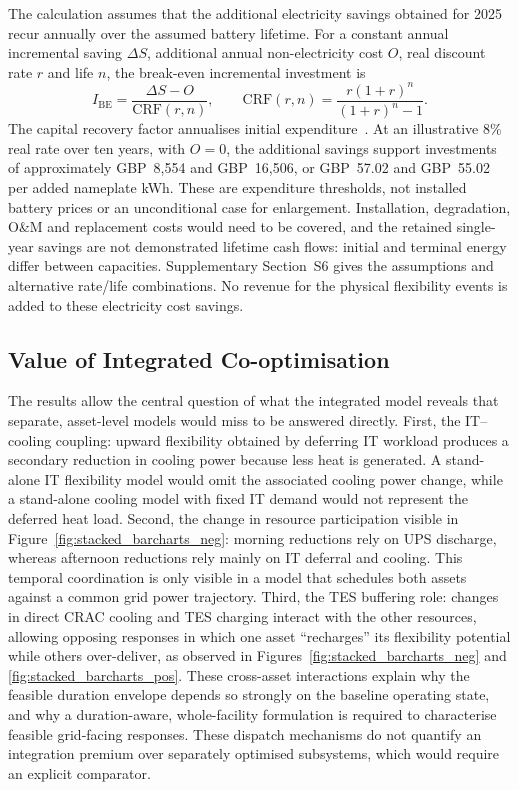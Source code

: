 \documentclass[lettersize,journal]{IEEEtran}
\begin{document}
The calculation assumes that the additional electricity savings obtained for 2025 recur annually over the assumed battery lifetime. For a constant annual incremental saving $\Delta S$, additional annual non-electricity cost $O$, real discount rate $r$ and life $n$, the break-even incremental investment is
\begin{equation}
I_{\mathrm{BE}}=\frac{\Delta S-O}{\mathrm{CRF}(r,n)},\qquad
\mathrm{CRF}(r,n)=\frac{r(1+r)^n}{(1+r)^n-1}.
\label{eq:ups-investment}
\end{equation}
The capital recovery factor annualises initial expenditure~\cite{sam_crf}. At an illustrative 8\% real rate over ten years, with $O=0$, the additional savings support investments of approximately GBP~8,554 and GBP~16,506, or GBP~57.02 and GBP~55.02 per added nameplate kWh. These are expenditure thresholds, not installed battery prices or an unconditional case for enlargement. Installation, degradation, O\&M and replacement costs would need to be covered, and the retained single-year savings are not demonstrated lifetime cash flows: initial and terminal energy differ between capacities. Supplementary Section~S6 gives the assumptions and alternative rate/life combinations. No revenue for the physical flexibility events is added to these electricity cost savings.


\subsection{Value of Integrated Co-optimisation}\label{sec:integration-value}
The results allow the central question of what the integrated model reveals that separate, asset-level models would miss to be answered directly. First, the IT--cooling coupling: upward flexibility obtained by deferring IT workload produces a secondary reduction in cooling power because less heat is generated. A stand-alone IT flexibility model would omit the associated cooling power change, while a stand-alone cooling model with fixed IT demand would not represent the deferred heat load. Second, the change in resource participation visible in Figure~\ref{fig:stacked_barcharts_neg}: morning reductions rely on UPS discharge, whereas afternoon reductions rely mainly on IT deferral and cooling. This temporal coordination is only visible in a model that schedules both assets against a common grid power trajectory. Third, the TES buffering role: changes in direct CRAC cooling and TES charging interact with the other resources, allowing opposing responses in which one asset ``recharges'' its flexibility potential while others over-deliver, as observed in Figures~\ref{fig:stacked_barcharts_neg} and \ref{fig:stacked_barcharts_pos}. These cross-asset interactions explain why the feasible duration envelope depends so strongly on the baseline operating state, and why a duration-aware, whole-facility formulation is required to characterise feasible grid-facing responses. These dispatch mechanisms do not quantify an integration premium over separately optimised subsystems, which would require an explicit comparator.
\end{document}
